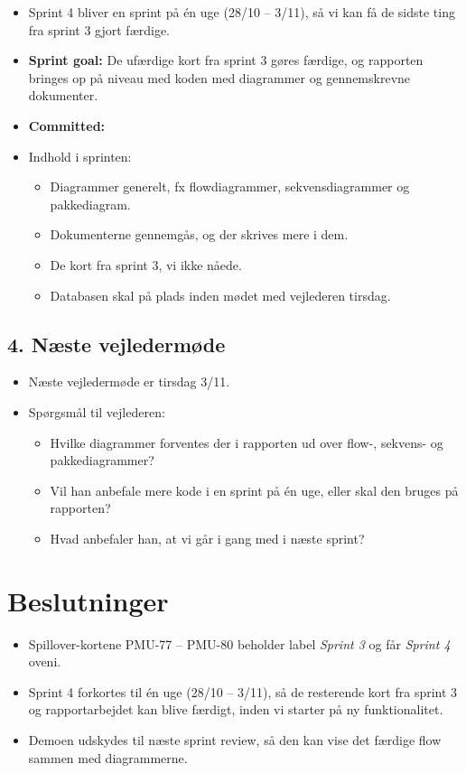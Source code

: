 \documentclass[a4paper,11pt]{article}
\begin{document}
\begin{itemize}
    \item Sprint 4 bliver en sprint på én uge (28/10 -- 3/11), så vi kan få de sidste ting fra sprint 3 gjort færdige.
    \item \textbf{Sprint goal:} De ufærdige kort fra sprint 3 gøres færdige, og rapporten bringes op på niveau med koden med diagrammer og gennemskrevne dokumenter.
    \item \textbf{Committed:}
    \item Indhold i sprinten:
    \begin{itemize}
        \item Diagrammer generelt, fx flowdiagrammer, sekvensdiagrammer og pakkediagram.
        \item Dokumenterne gennemgås, og der skrives mere i dem.
        \item De kort fra sprint 3, vi ikke nåede.
        \item Databasen skal på plads inden mødet med vejlederen tirsdag.
    \end{itemize}
\end{itemize}

\subsection*{4. Næste vejledermøde}

\begin{itemize}
    \item Næste vejledermøde er tirsdag 3/11.
    \item Spørgsmål til vejlederen:
    \begin{itemize}
        \item Hvilke diagrammer forventes der i rapporten ud over flow-, sekvens- og pakkediagrammer?
        \item Vil han anbefale mere kode i en sprint på én uge, eller skal den bruges på rapporten?
        \item Hvad anbefaler han, at vi går i gang med i næste sprint?
    \end{itemize}
\end{itemize}

\section*{Beslutninger}

\begin{itemize}
    \item Spillover-kortene PMU-77 -- PMU-80 beholder label \emph{Sprint 3} og får \emph{Sprint 4} oveni.
    \item Sprint 4 forkortes til én uge (28/10 -- 3/11), så de resterende kort fra sprint 3 og rapportarbejdet kan blive færdigt, inden vi starter på ny funktionalitet.
    \item Demoen udskydes til næste sprint review, så den kan vise det færdige flow sammen med diagrammerne.
\end{itemize}
\end{document}
